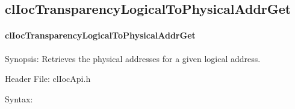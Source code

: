 \begin{flushleft}
\subsection{clIocTransparencyLogicalToPhysicalAddrGet}
\hypertarget{pageioc121}{}\paragraph{cl\-Ioc\-Transparency\-Logical\-To\-Physical\-Addr\-Get}
\label{pageioc121}
\begin{Desc}
\item[Synopsis:]Retrieves the physical addresses for a given logical address.\end{Desc}
\begin{Desc}
\item[Header File:]clIocApi.h\end{Desc}
\begin{Desc}
\item[Syntax:]


\end{Desc}
\end{flushleft}

